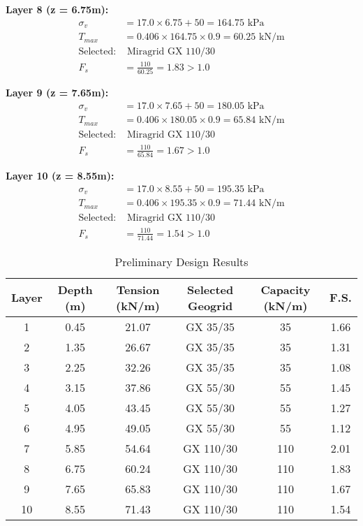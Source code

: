 \documentclass[10pt,a4paper,twocolumn]{article}
\begin{document}
\textbf{Layer 8 (z = 6.75m):}
\begin{align}
\sigma_v &= 17.0 \times 6.75 + 50 = 164.75 \text{ kPa} \\
T_{max} &= 0.406 \times 164.75 \times 0.9 = 60.25 \text{ kN/m} \\
\text{Selected:} &\text{ Miragrid GX 110/30} \\
F_s &= \frac{110}{60.25} = 1.83 > 1.0 
\end{align}

\textbf{Layer 9 (z = 7.65m):}
\begin{align}
\sigma_v &= 17.0 \times 7.65 + 50 = 180.05 \text{ kPa} \\
T_{max} &= 0.406 \times 180.05 \times 0.9 = 65.84 \text{ kN/m} \\
\text{Selected:} &\text{ Miragrid GX 110/30} \\
F_s &= \frac{110}{65.84} = 1.67 > 1.0 
\end{align}

\textbf{Layer 10 (z = 8.55m):}
\begin{align}
\sigma_v &= 17.0 \times 8.55 + 50 = 195.35 \text{ kPa} \\
T_{max} &= 0.406 \times 195.35 \times 0.9 = 71.44 \text{ kN/m} \\
\text{Selected:} &\text{ Miragrid GX 110/30} \\
F_s &= \frac{110}{71.44} = 1.54 > 1.0 
\end{align}

\begin{table}[htbp]
\centering
\caption{Preliminary Design Results}
\begin{tabular}{|c|c|c|c|c|c|}
\hline
\textbf{Layer} & \textbf{Depth (m)} & \textbf{Tension (kN/m)} & \textbf{Selected Geogrid} & \textbf{Capacity (kN/m)} & \textbf{F.S.} \\
\hline
1 & 0.45 & 21.07 & GX 35/35 & 35 & 1.66 \\
2 & 1.35 & 26.67 & GX 35/35 & 35 & 1.31 \\
3 & 2.25 & 32.26 & GX 35/35 & 35 & 1.08 \\
4 & 3.15 & 37.86 & GX 55/30 & 55 & 1.45 \\
5 & 4.05 & 43.45 & GX 55/30 & 55 & 1.27 \\
6 & 4.95 & 49.05 & GX 55/30 & 55 & 1.12 \\
7 & 5.85 & 54.64 & GX 110/30 & 110 & 2.01 \\
8 & 6.75 & 60.24 & GX 110/30 & 110 & 1.83 \\
9 & 7.65 & 65.83 & GX 110/30 & 110 & 1.67 \\
10 & 8.55 & 71.43 & GX 110/30 & 110 & 1.54 \\
\hline
\end{tabular}
\end{table}
\end{document}
